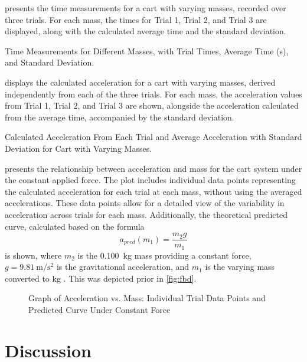 ﻿\documentclass[reprint,amsmath,amssymb.aps]{revtex4-2}
\begin{document}
 presents the time measurements for a cart with varying masses, recorded over three trials. For each mass, the times for Trial 1, Trial 2, and Trial 3 are displayed, along with the calculated average time and the standard deviation. 
\begin{table}
\caption{Time Measurements for Different Masses, with Trial Times, Average Time (s), and Standard Deviation.}
\label{tab:fig3}
\end{table}

 displays the calculated acceleration for a cart with varying masses, derived independently from each of the three trials. For each mass, the acceleration values from Trial 1, Trial 2, and Trial 3 are shown, alongside the acceleration calculated from the average time, accompanied by the standard deviation. 
\begin{table}
\caption{Calculated Acceleration From Each Trial and Average Acceleration with Standard Deviation for Cart with Varying Masses.}
\label{tab:fig4}
\end{table}

 presents the relationship between acceleration and mass for the cart system under the constant applied force. The plot includes individual data points representing the calculated acceleration for each trial at each mass, without using the averaged accelerations. These data points allow for a detailed view of the variability in acceleration across trials for each mass. Additionally, the theoretical predicted curve, calculated based on the formula  
\begin{equation}
a_{pred}(m_1) = \dfrac{m_2 g}{m_1}
\end{equation}
is shown, where $m_2$ is the \qty{0.100}{\kilo\gram} mass providing a constant force, $g=\qty{9.81}{\meter\per\second\squared}$ is the gravitational acceleration, and $m_1$ is the varying mass converted to kg \cite{knight2017physics}. This was depicted prior in \cref{fig:fbd}.

\begin{figure}
\caption{Graph of Acceleration vs. Mass: Individual Trial Data Points and Predicted Curve Under Constant Force}
\label{fig:5}
\end{figure}








\section{Discussion}
\end{document}
